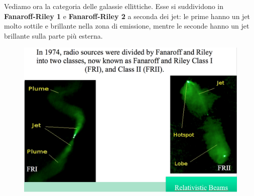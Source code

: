 \documentclass[a4paper,11pt]{article}
\begin{document}
Vediamo ora la categoria delle galassie ellittiche. Esse si suddividono in \textbf{Fanaroff-Riley 1} e \textbf{Fanaroff-Riley 2} a seconda dei jet: le prime hanno un jet molto sottile e brillante nella zona di emissione, mentre le seconde hanno un jet brillante sulla parte più esterna.\\
\begin{figure} [h]
        \centering
        \includegraphics[width=\textwidth]{immagini_lezioni12-12/49.png}
        \label{}
    \end{figure}
\end{document}
